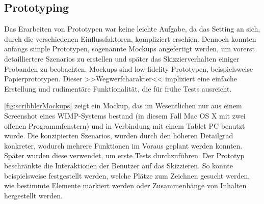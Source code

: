 \subsection{Prototyping}
Das Erarbeiten von Prototypen war keine leichte Aufgabe, da das Setting an sich, durch die verschiedenen Einflussfaktoren, kompliziert erschien. Dennoch konnten anfangs simple Prototypen, sogenannte Mockups angefertigt werden, um vorerst detailliertere Szenarios zu erstellen und später das Skizzierverhalten einiger Probanden zu beobachten. Mockups sind low-fidelity Prototypen, beispielsweise Papierprototypen. Dieser >>Wegwerfcharakter<< impliziert eine einfache Erstellung und rudimentäre Funktionalität, die für frühe Tests ausreicht.

\medskip \autoref{fig:scribblerMockups} zeigt ein Mockup, das im Wesentlichen nur aus einem Screenshot eines \acs{WIMP}-Systems bestand (in diesem Fall Mac OS X mit zwei offenen Programmfenstern) und in Verbindung mit einem Tablet PC benutzt wurde. Die konzipierten Szenarios, wurden durch den höheren Detailgrad konkreter, wodurch mehrere Funktionen im Voraus geplant werden konnten. Später wurden diese verwendet, um erste Tests durchzuführen. Der Prototyp beschränkte die Interaktionen der Benutzer auf das Skizzieren. So konnte beispielsweise festgestellt werden, welche Plätze zum Zeichnen gesucht werden, wie bestimmte Elemente markiert werden oder Zusammenhänge von Inhalten hergestellt werden.

